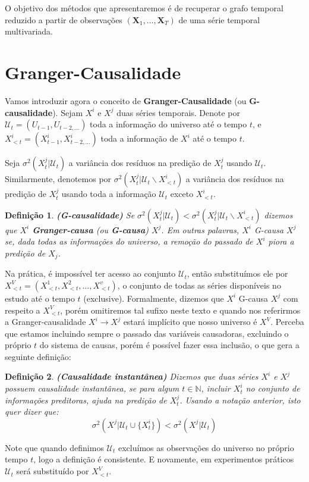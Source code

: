 \documentclass[12pt,letterpaper]{article}
\newtheorem{defi}{Definição}
\newcommand{\bd}[1]{\boldsymbol{#1}}
\newcommand{\N}{\mathbb{N}}
\begin{document}
	 O objetivo dos métodos que apresentaremos é de recuperar o grafo temporal reduzido a partir de observações $(\bd X_1,\ldots,\bd X_T)$ de uma série temporal multivariada.
	 
	 \section{Granger-Causalidade}
	 
	 Vamos introduzir agora o conceito de \textbf{Granger-Causalidade} (ou \textbf{G-causalidade}). Sejam $X^i$ e $X^j$ duas séries temporais. Denote por $\mathcal{U}_t=(U_{t-1},U_{t-2,\ldots})$ toda a informação do universo até o tempo $t$, e $X^i_{<t}=(X^i_{t-1},X^i_{t-2,\ldots})$ toda a informação de $X^i$ até o tempo $t$.
	 
	 Seja $\sigma^2(X^j_t|\mathcal{U}_t)$ a variância dos resíduos na predição de $X^j_t$ usando $\mathcal{U}_t$. Similarmente, denotemos por $\sigma^2(X^j_t|\mathcal{U}_t\backslash X^i_{<t})$ a variância dos resíduos na predição de $X^j_t$ usando toda a informação $\mathcal{U}_t$ exceto $X^i_{<t}$.
	 
	 \begin{defi}\textbf{(G-causalidade)}
	 	Se $\sigma^2(X^j_t|\mathcal{U}_t)<\sigma^2(X^j_t|\mathcal{U}_t\backslash X^i_{<t})$ dizemos que $X^i$ \textbf{Granger-causa} (ou \textbf{G-causa}) $X^j$. Em outras palavras, $X^i$ G-causa $X^j$ se, dada todas as informações do universo, a remoção do passado de $X^i$ piora a predição de $X_j$.
	 \end{defi}
	 
	 Na prática, é impossível ter acesso ao conjunto $\mathcal{U}_t$, então substituímos ele por $X^V_ {<t}=(X^1_{<t},X^2_{<t},\ldots,X^v_{<t})$, o conjunto de todas as séries disponíveis no estudo até o tempo $t$ (exclusive). Formalmente, dizemos que $X^i$ G-causa $X^j$ com respeito a $X^V_{<t}$, porém omitiremos tal sufixo neste texto e quando nos referirmos a Granger-causalidade $X^i\rightarrow X^j$ estará implícito que nosso universo é $X^V$. Perceba que estamos incluindo sempre o passado das variáveis causadoras, excluindo o próprio $t$ do sistema de causas, porém é possível fazer essa inclusão, o que gera a seguinte definição: %
	 
	 \begin{defi}\label{inst}\textbf{(Causalidade instantânea)} 
	 	Dizemos que duas séries $X^i$ e $X^j$ possuem causalidade instantânea, se para algum $t\in\N$, incluir $X^i_t$ no conjunto de informações preditoras, ajuda na predição de $X^j_t$. Usando a notação anterior, isto quer dizer que:
	 	$$\sigma^2(X^j|\mathcal{U}_t\cup\{X^i_t\})<\sigma^2(X^j|\mathcal{U}_t)$$
 	 \end{defi}
	 Note que quando definimos $\mathcal{U}_t$ excluímos as observações do universo no próprio tempo $t$, logo a definição é consistente. E novamente, em experimentos práticos $\mathcal{U}_t$ será substituído por $X^V_{<t}$.
	 
\end{document}
